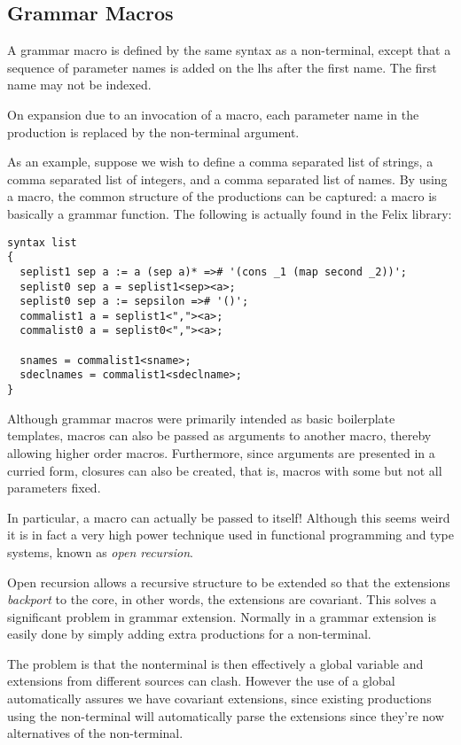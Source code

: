 \documentclass[oneside]{book}
\begin{document}
\subsection{Grammar Macros}
A grammar macro is defined by the same syntax as a non-terminal,
except that a sequence of parameter names is added on the lhs after
the first name. The first name may not be indexed.

On expansion due to an invocation of a macro, each parameter
name in the production is replaced by the non-terminal argument.

As an example, suppose we wish to define a comma separated list
of strings, a comma separated list of integers, and a comma 
separated list of names. By using a macro, the common structure
of the productions can be captured: a macro is basically 
a grammar function. The following is actually found in the
Felix library: 

\begin{verbatim}
syntax list 
{
  seplist1 sep a := a (sep a)* =># '(cons _1 (map second _2))'; 
  seplist0 sep a = seplist1<sep><a>;
  seplist0 sep a := sepsilon =># '()';
  commalist1 a = seplist1<","><a>;
  commalist0 a = seplist0<","><a>;

  snames = commalist1<sname>;
  sdeclnames = commalist1<sdeclname>;
}
\end{verbatim}

Although grammar macros were primarily intended as basic boilerplate
templates, macros can also be passed as arguments to another macro,
thereby allowing higher order macros. Furthermore, since arguments
are presented in a curried form, closures can also be created,
that is, macros with some but not all parameters fixed.

In particular, a macro can actually be passed to itself!
Although this seems weird it is in fact a very high power
technique used in functional programming and type systems,
known as {\em open recursion}.

Open recursion allows a recursive structure to be extended
so that the extensions {\em backport} to the core, in other
words, the extensions are covariant. This solves a significant
problem in grammar extension. Normally in a grammar extension
is easily done by simply adding extra productions for a non-terminal.

The problem is that the nonterminal is then effectively a global 
variable and extensions from different sources can clash. However
the use of a global automatically assures we have covariant extensions,
since existing productions using the non-terminal will automatically
parse the extensions since they're now alternatives of the non-terminal.
\end{document}
